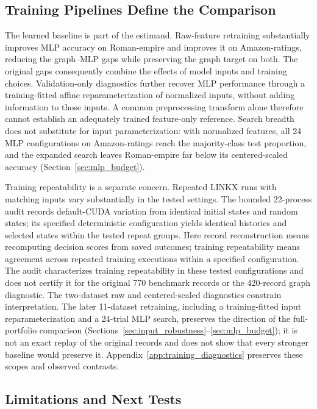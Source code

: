 \subsection{Training Pipelines Define the Comparison}

The learned baseline is part of the estimand. Raw-feature retraining substantially improves MLP accuracy on Roman-empire and improves it on Amazon-ratings, reducing the graph--MLP gaps while preserving the graph target on both. The original gaps consequently combine the effects of model inputs and training choices. Validation-only diagnostics further recover MLP performance through a training-fitted affine reparameterization of normalized inputs, without adding information to those inputs. A common preprocessing transform alone therefore cannot establish an adequately trained feature-only reference. Search breadth does not substitute for input parameterization: with normalized features, all 24 MLP configurations on Amazon-ratings reach the majority-class test proportion, and the expanded search leaves Roman-empire far below its centered-scaled accuracy (Section~\ref{sec:mlp_budget}).

Training repeatability is a separate concern. Repeated LINKX runs with matching inputs vary substantially in the tested settings. The bounded 22-process audit records default-CUDA variation from identical initial states and random states; its specified deterministic configuration yields identical histories and selected states within the tested repeat groups. Here record reconstruction means recomputing decision scores from saved outcomes; training repeatability means agreement across repeated training executions within a specified configuration. The audit characterizes training repeatability in these tested configurations and does not certify it for the original 770 benchmark records or the 420-record graph diagnostic. The two-dataset raw and centered-scaled diagnostics constrain interpretation. The later 11-dataset retraining, including a training-fitted input reparameterization and a 24-trial MLP search, preserves the direction of the full-portfolio comparison (Sections~\ref{sec:input_robustness}--\ref{sec:mlp_budget}); it is not an exact replay of the original records and does not show that every stronger baseline would preserve it. Appendix~\ref{app:training_diagnostics} preserves these scopes and observed contrasts.

\subsection{Limitations and Next Tests}

